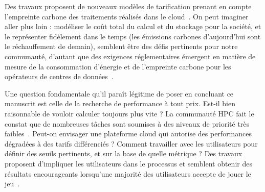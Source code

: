 Des travaux proposent de nouveaux modèles de tarification prenant en compte l'empreinte carbone des traitements réalisés dans le cloud~\cite{linBridgingSustainabilityGap2024}. On peut imaginer aller plus loin : modéliser le coût total du calcul et du stockage pour la société, et le représenter fidèlement dans le temps (les émissions carbones d'aujourd'hui sont le réchauffement de demain), semblent être des défis pertinents pour notre communauté, d'autant que des exigences réglementaires émergent en matière de mesure de la consommation d'énergie et de l'empreinte carbone pour les opérateurs de centres de données~\cite{davisUptimeInstituteGlobal2022}.


Une question fondamentale qu'il paraît légitime de poser en concluant ce manuscrit est celle de la recherche de performance à tout prix. Est-il bien raisonnable de vouloir calculer toujours plus vite ? La communauté \gls{HPC} fait le constat que de nombreuses tâches sont soumises à des niveaux de priorité très faibles~\cite{tirmaziBorgNextGeneration2020}. Peut-on envisager une plateforme cloud qui autorise des performances dégradées à des tarifs différenciés ? Comment travailler avec les utilisateurs pour définir des seuils pertinents, et sur la base de quelle métrique ? Des travaux proposent d'impliquer les utilisateurs dans le processus et semblent obtenir des résultats encourageants lorsqu'une majorité des utilisateurs accepte de jouer le jeu~\cite{mokhtariDigitalSustainabilityInvolving}.
